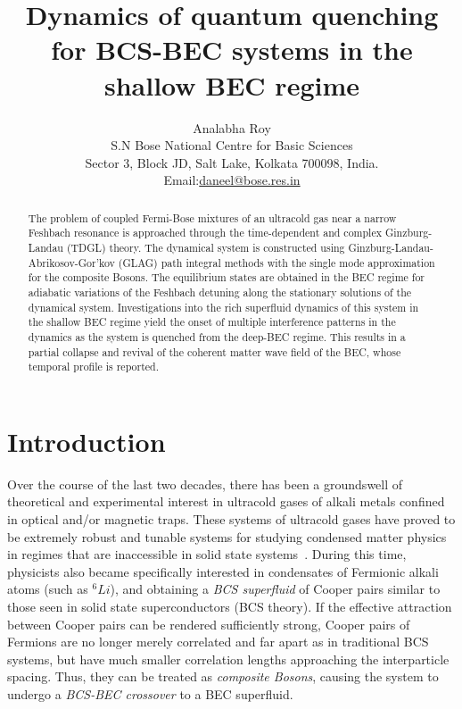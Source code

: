 \documentclass[a4paper,10pt]{article}
\begin{document}
\title{Dynamics of quantum quenching for BCS-BEC systems in the shallow BEC regime}
%
\author{\normalsize{Analabha Roy} \\
\normalsize{S.N Bose National Centre for Basic Sciences}\\
\normalsize{Sector 3, Block JD, Salt Lake, Kolkata 700098, India.}\\
\normalsize{Email:\url{daneel@bose.res.in}}
}
%
\maketitle
\begin{abstract}
The problem of coupled Fermi-Bose mixtures of an ultracold gas near a narrow Feshbach resonance is approached through the time-dependent and complex Ginzburg-Landau (TDGL) theory. The dynamical system is constructed using Ginzburg-Landau-Abrikosov-Gor'kov (GLAG) path integral methods with the single mode approximation for the composite Bosons.  {The equilibrium states are obtained in the BEC regime for adiabatic variations of the Feshbach detuning along the stationary solutions of the dynamical system}. Investigations into the rich superfluid dynamics of this system in the shallow BEC regime  {yield} the onset of multiple interference patterns in the dynamics as the system is quenched from the deep-BEC regime. This results in a partial collapse and revival of the coherent matter wave field of the BEC, whose temporal profile is reported.
\end{abstract}

\section{Introduction}
\label{sec:intro}
Over the course of the last two decades, there has been a groundswell of theoretical and experimental interest in ultracold gases of alkali metals confined in optical and/or magnetic traps. These systems of ultracold gases have proved to be extremely robust and tunable systems for studying condensed matter physics in regimes that are inaccessible in solid state systems~\cite{lewenstein:review}. During this time, physicists also became specifically interested in condensates of Fermionic alkali atoms (such as $^{6}Li$), and obtaining a \textit{BCS superfluid} of Cooper pairs similar to those seen in solid state superconductors (BCS theory). If the effective attraction between Cooper pairs can be rendered sufficiently strong, Cooper pairs of Fermions are no longer merely correlated and far apart as in traditional BCS systems, but have much smaller correlation lengths approaching the interparticle spacing. Thus, they can be treated as \textit{composite Bosons}, causing the system to undergo a \textit{BCS-BEC crossover} to a BEC superfluid. 
\end{document}
